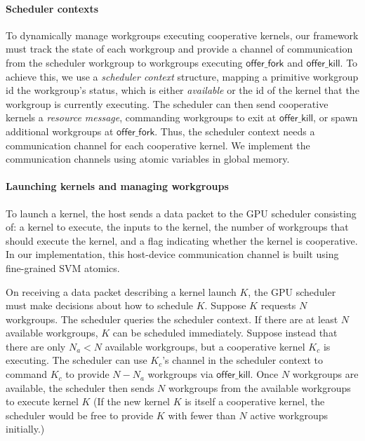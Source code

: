 \documentclass[numbers,nocopyrightspace,10pt]{sigplanconf}
\newcommand{\KC}{\mathit{KC}}
\newcommand{\offerfork}{\mathsf{offer\_fork}}
\newcommand{\offerkill}{\mathsf{offer\_kill}}
\newcommand{\getgroupid}{\mathsf{get\_group\_id}}
\newcommand{\getnumgroups}{\mathsf{get\_num\_groups}}
\begin{document}
\paragraph{Scheduler contexts}


To dynamically manage workgroups executing cooperative
kernels, our framework must track the state of each workgroup and
provide a channel of communication from the scheduler workgroup to
workgroups executing $\offerfork$ and $\offerkill$. To achieve this,
we use a \emph{scheduler context} structure, mapping a primitive workgroup id the workgroup's status, which is either \emph{available} or the id of the kernel that the workgroup is currently executing.  The scheduler can then send cooperative
kernels a \emph{resource message}, commanding workgroups to exit at $\offerkill$, or 
spawn additional workgroups at $\offerfork$. Thus, the
scheduler context needs a communication channel for each cooperative
kernel. We implement the communication channels using atomic variables in global memory.

\paragraph{Launching kernels and managing workgroups}

To launch a kernel, the host sends a data packet to the GPU
scheduler consisting of: a kernel to execute, the inputs to the kernel, the
number of workgroups that should execute the kernel, and a flag indicating whether the kernel
is cooperative. In our implementation, this host-device communication channel is built using fine-grained SVM atomics.

On receiving a data packet
describing a kernel launch $K$, the GPU scheduler must make decisions
about how to schedule $K$. Suppose $K$ requests
$N$ workgroups. The scheduler queries the scheduler context.  If
there are at least $N$ available workgroups, $K$ can be scheduled
immediately. Suppose instead that there are only $N_a < N$ available workgroups, but a cooperative kernel $K_c$ is
executing. The scheduler can use $K_c$'s channel in the scheduler context to command $K_c$ to provide $N - N_a$ workgroups via $\offerkill$.
Once $N$ workgroups are available,
the scheduler then sends $N$
workgroups from the available workgroups to execute kernel $K$
(If the new kernel $K$ is itself a cooperative kernel, the scheduler would be free to provide $K$ with fewer than $N$ active workgroups initially.)
\end{document}
